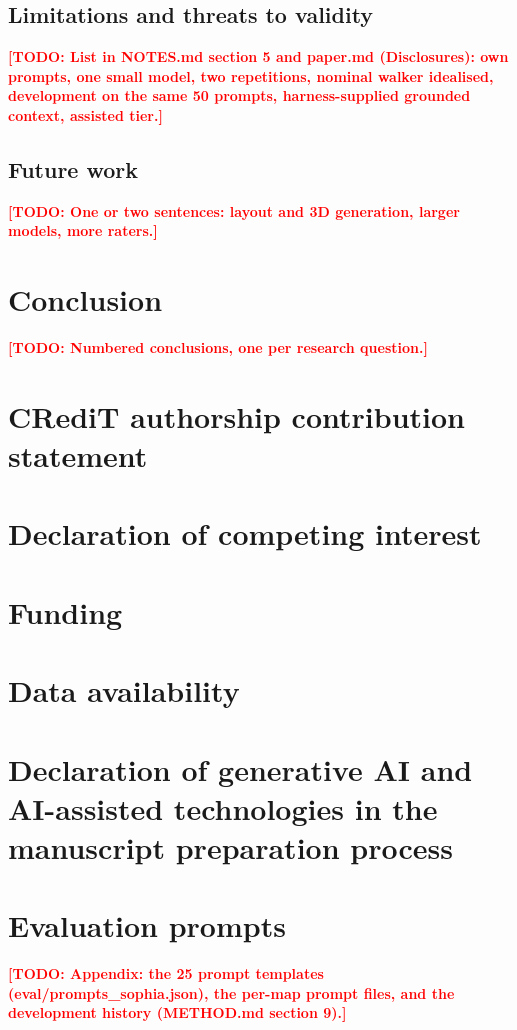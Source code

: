 \documentclass[preprint,12pt]{elsarticle}
\newcommand{\todo}[1]{\textcolor{red}{\textbf{[TODO: #1]}}}
\begin{document}
\subsection{Limitations and threats to validity}
\todo{List in NOTES.md section 5 and paper.md (Disclosures): own prompts, one small model, two repetitions, nominal walker idealised, development on the same 50 prompts, harness-supplied grounded context, assisted tier.}
\subsection{Future work}
\todo{One or two sentences: layout and 3D generation, larger models, more raters.}

\section{Conclusion}
\todo{Numbered conclusions, one per research question.}

\section*{CRediT authorship contribution statement}

\section*{Declaration of competing interest}

\section*{Funding}

\section*{Data availability}

\section*{Declaration of generative AI and AI-assisted technologies in the manuscript preparation process}

\appendix
\section{Evaluation prompts}
\label{app:prompts}
\todo{Appendix: the 25 prompt templates (eval/prompts\_sophia.json), the per-map prompt files, and the development history (METHOD.md section 9).}



\end{document}
